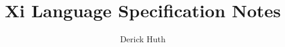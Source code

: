 \documentclass{article}
\begin{document}
\title{Xi Language Specification Notes}
\author{Derick Huth}
\maketitle




\end{document}
